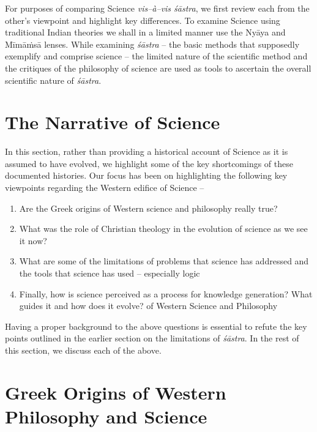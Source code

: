 For purposes of comparing Science \textit{vis–à–vis śāstra}, we first review each from the other’s viewpoint and highlight key differences. To examine Science using traditional Indian theories we shall in a limited manner use the Nyāya and Mīmāṁsā lenses. While examining \textit{śāstra} – the basic methods that supposedly exemplify and comprise science – the limited nature of the scientific method and the critiques of the philosophy of science are used as tools to ascertain the overall scientific nature of \textit{śāstra}.


\section*{The Narrative of Science }

In this section, rather than providing a historical account of Science as it is assumed to have evolved, we highlight some of the key shortcomings of these documented histories. Our focus has been on highlighting the following key viewpoints regarding the Western edifice of Science –

\begin{enumerate}
\item Are the Greek origins of Western science and philosophy really true?

 \item What was the role of Christian theology in the evolution of science as we see it now?

 \item What are some of the limitations of problems that science has addressed and the tools that science has used – especially logic

 \item Finally, how is science perceived as a process for knowledge generation? What guides it and how does it evolve?
of Western Science and Philosophy
\end{enumerate}

Having a proper background to the above questions is essential to refute the key points outlined in the earlier section on the limitations of \textit{śāstra}. In the rest of this section, we discuss each of the above.


\section*{Greek Origins of Western Philosophy and Science}

